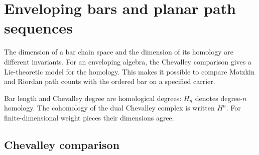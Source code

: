 \chapter{Enveloping bars and planar path sequences}
\label{ch:enveloping-audit}

The dimension of a bar chain space and the dimension of its homology are different invariants. For an enveloping algebra, the Chevalley comparison gives a Lie-theoretic model for the homology. This makes it possible to compare Motzkin and Riordan path counts with the ordered bar on a specified carrier.

Bar length and Chevalley degree are homological degrees: $H_n$ denotes degree-$n$ homology. The cohomology of the dual Chevalley complex is written $H^n$. For finite-dimensional weight pieces their dimensions agree.

\section{Chevalley comparison}

